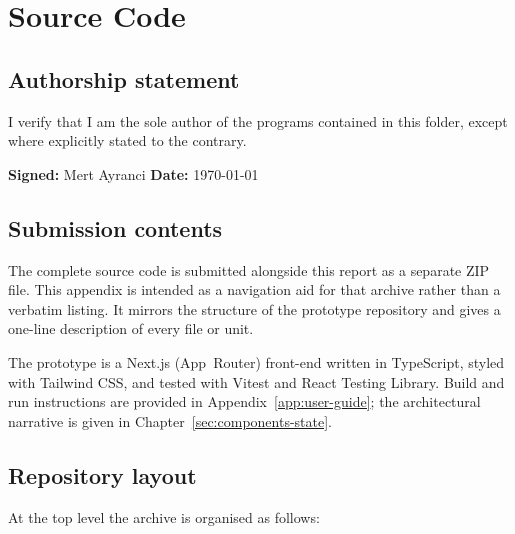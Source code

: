 \chapter{Source Code}
\label{app:source-code}

\section*{Authorship statement}

\noindent
I verify that I am the sole author of the programs contained in this folder, except where explicitly stated to the contrary.

\vspace{1em}
\noindent
\textbf{Signed:} Mert Ayranci \hfill \textbf{Date:} \today

\section{Submission contents}
\label{sec:source-submission}

\noindent
The complete source code is submitted alongside this report as a separate ZIP file. This appendix is intended as a navigation aid for that archive rather than a verbatim listing. It mirrors the structure of the prototype repository and gives a one-line description of every file or unit.

The prototype is a Next.js (App~Router) front-end written in TypeScript, styled with Tailwind CSS, and tested with Vitest and React Testing Library. Build and run instructions are provided in Appendix~\ref{app:user-guide}; the architectural narrative is given in Chapter~\ref{sec:components-state}.

\section{Repository layout}
\label{sec:source-layout}

\noindent
At the top level the archive is organised as follows:

